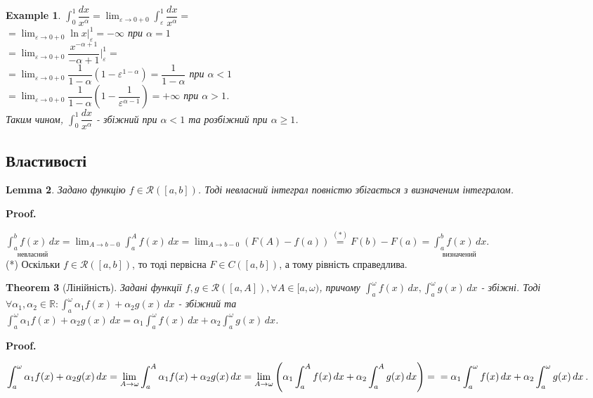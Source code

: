 \documentclass[a4paper, 10pt]{article}
\makeatletter
\def\huge{\displaystyle}
\def\qed{$\blacksquare$}
\theoremstyle{theoremdd}
\newtheorem{theorem}{Theorem}[subsection]
\theoremstyle{theoremdd}
\theoremstyle{theoremdd}
\theoremstyle{theoremdd}
\theoremstyle{theoremdd}
\newtheorem{example}[theorem]{Example}
\theoremstyle{theoremdd}
\theoremstyle{theoremdd}
\theoremstyle{theoremdd}
\newtheorem{lemma}[theorem]{Lemma}
\theoremstyle{theoremdd}
\renewenvironment{proof}[1][Proof.\\]{\par
\pushQED{\hfill \qed}%
\normalfont \topsep6\p@\@plus6\p@\relax
\trivlist
\item\relax
{\bfseries
#1\@addpunct{.}}\hspace\labelsep\ignorespaces
}{%
\popQED\endtrivlist\@endpefalse
}
\makeatother
\begin{document}
\begin{example}
$\huge\int_0^1 \dfrac{dx}{x^{\alpha}} = \lim_{\varepsilon \to 0+0} \int_\varepsilon^1 \dfrac{dx}{x^{\alpha}} \boxed{=}$\\
$= \huge\lim_{\varepsilon \to 0+0} \ln x \Big|_\varepsilon^1 = -\infty$ при $\alpha = 1$\\
$= \huge\lim_{\varepsilon \to 0+0} \dfrac{x^{-\alpha+1}}{-\alpha+1} \Big|_\varepsilon^1 =$\\
$=\huge\lim_{\varepsilon \to 0+0} \dfrac{1}{1-\alpha} \left( 1 - \varepsilon^{1-\alpha} \right) = \dfrac{1}{1-\alpha}$ при $\alpha < 1$\\
$=\huge\lim_{\varepsilon \to 0+0} \dfrac{1}{1-\alpha} \left( 1 - \dfrac{1}{\varepsilon^{\alpha-1}} \right) = +\infty$ при $\alpha > 1$.\\
Таким чином, $\huge\int_0^1 \dfrac{dx}{x^\alpha}$ - збіжний при $\alpha < 1$ та розбіжний при $\alpha \geq 1$.
\end{example}

\subsection{Властивості}
\begin{lemma}
Задано функцію $f \in \mathcal{R}([a,b])$. Тоді невласний інтеграл повністю збігається з визначеним інтегралом.
\end{lemma}

\begin{proof}
$\underset{\text{невласний}}{\huge\int_a^b f(x)\,dx} = \huge \lim_{A \to b-0} \int_a^A f(x)\,dx = \huge \lim_{A \to b-0} (F(A)-f(a)) \overset{(*)}{=} F(b) - F(a) = \underset{\text{визначений}}{\huge\int_a^b f(x)\,dx}$.\\
(*) Оскільки $f \in \mathcal{R}([a,b])$, то тоді первісна $F \in C([a,b])$, а тому рівність справедлива.
\end{proof}

\begin{theorem}[Лінійність]
Задані функції $f,g \in \mathcal{R}([a,A]), \forall A \in [a,\omega)$, причому $\huge\int_a^\omega f(x)\,dx, \huge\int_a^\omega g(x)\,dx$ - збіжні. Тоді $\forall \alpha_1,\alpha_2 \in \mathbb{R}: \huge\int_a^\omega \alpha_1 f(x) + \alpha_2 g(x)\,dx$ - збіжний та\\
$\huge\int_a^\omega \alpha_1 f(x) + \alpha_2 g(x)\,dx = \alpha_1 \int_a^\omega f(x)\,dx + \alpha_2 \int_a^\omega g(x)\,dx$.
\end{theorem}

\begin{proof}
$\huge\int_a^\omega \alpha_1 f(x) + \alpha_2 g(x)\,dx = \lim_{A \to \omega} \int_a^A \alpha_1 f(x) + \alpha_2 g(x)\,dx = \lim_{A \to \omega} \left( \alpha_1 \int_a^A f(x)\,dx + \alpha_2 \int_a^A g(x)\,dx \right) = \\ = \alpha_1 \int_a^\omega f(x)\,dx + \alpha_2 \int_a^\omega g(x)\,dx$.
\end{proof}
\end{document}
